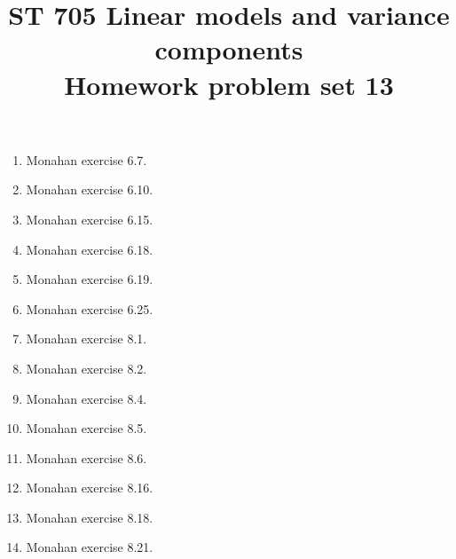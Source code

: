 \documentclass[11pt]{article}
\title{ST 705 Linear models and variance components \\ 
        Homework problem set 13}
\begin{document}
\maketitle

\begin{enumerate}

\item Monahan exercise 6.7.

\item Monahan exercise 6.10.

\item Monahan exercise 6.15.

\item Monahan exercise 6.18.

\item Monahan exercise 6.19.

\item Monahan exercise 6.25.

\item Monahan exercise 8.1.

\item Monahan exercise 8.2.

\item Monahan exercise 8.4.

\item Monahan exercise 8.5.

\item Monahan exercise 8.6.

\item Monahan exercise 8.16.

\item Monahan exercise 8.18.

\item Monahan exercise 8.21.

\end{enumerate}
\end{document}
